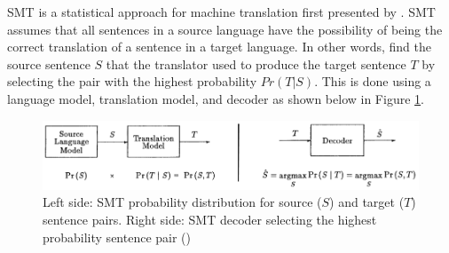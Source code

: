 \acrfull{SMT} is a statistical approach for machine translation first presented by \cite{brown_statistical_1990}. 
\acrshort{SMT} assumes that all sentences in a source language have the possibility of being the correct translation of a sentence in a target language. 
In other words, find the source sentence $S$ that the translator used to produce the target sentence $T$ by selecting the pair with the highest probability $Pr ( T | S )$.
This is done using a language model, translation model, and decoder as shown below in Figure \ref{fig:smt_diagram}.

\begin{figure}[ht!]
\centering
\includegraphics[width=1\textwidth]{media/literature/machine_translation/smt_3.png}
\caption[Diagram of \acrshort{SMT} probability distribution and decoder]{Left side: \acrshort{SMT} probability distribution for source ($S$) and target ($T$) sentence pairs. Right side: \acrshort{SMT} decoder selecting the highest probability sentence pair (\cite{brown_statistical_1990})}
\label{fig:smt_diagram}
\end{figure}










